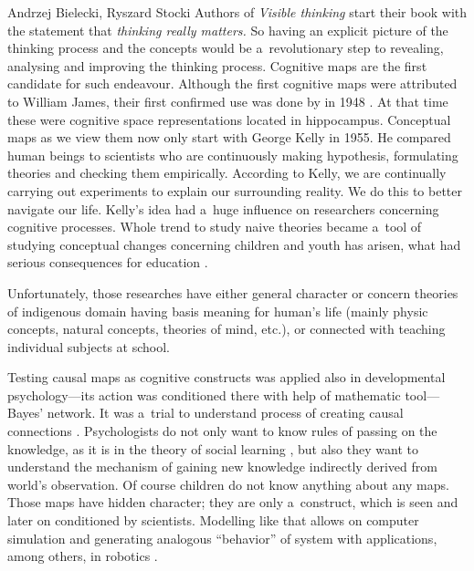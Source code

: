 \begin{artengenv2auth}{Andrzej Bielecki, Ryszard Stocki}
Authors of \textit{Visible thinking} 
\parencite[][]{brysson_visible_2004} %
 start their book with the statement that \textit{thinking really matters.} So having an explicit picture of the thinking process and the concepts would be a~revolutionary step to revealing, analysing and improving the thinking process. Cognitive maps are the first candidate for such endeavour. Although the first cognitive maps were attributed to William James, their first confirmed use was done by in 1948 
\parencite[][]{tolman_cognitive_1948}. %
 At that time these were cognitive space representations located in hippocampus. Conceptual maps as we view them now only start with George Kelly in 1955. He compared human beings to scientists who are continuously making hypothesis, formulating theories and checking them empirically. According to Kelly, we are continually carrying out experiments to explain our surrounding reality. We do this to better navigate our life. Kelly's idea had a~huge influence on researchers concerning cognitive processes. Whole trend to study naive theories became a~tool of studying conceptual changes concerning children and youth has arisen, what had serious consequences for education 
\parencites[][]{kuhn_children_1989}[][]{vosniadou_towards_1996}.%




Unfortunately, those researches have either general character 
\parencite[e.g][]{kruglansky_lay_1980} %
 or concern theories of indigenous domain having basis meaning for human's life (mainly physic concepts, natural concepts, theories of mind, etc.), or connected with teaching individual subjects at school.



Testing causal maps as cognitive constructs was applied also in developmental psychology---its action was conditioned there with help of mathematic tool---Bayes' network. It was a~trial to understand process of creating causal connections 
\parencite[][]{gopnik_theory_2004}. %
 Psychologists do not only want to know rules of passing on the knowledge, as it is in the theory of social learning 
\parencite[][]{bandura_social_1977}, %
 but also they want to understand the mechanism of gaining new knowledge indirectly derived from world's observation. Of course children do not know anything about any maps. Those maps have hidden character; they are only a~construct, which is seen and later on conditioned by scientists. Modelling like that allows on computer simulation and generating analogous ``behavior'' of system with applications, among others, in robotics 
\parencite[][]{chaib-draa_causal_2002}.%





\end{artengenv2auth}
